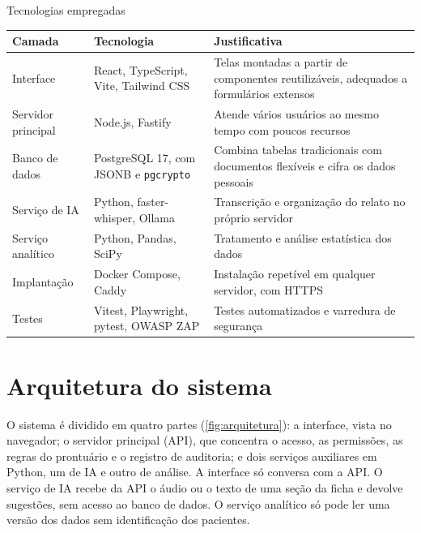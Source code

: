 \begin{quadro}[htbp]
	\caption{Tecnologias empregadas}
	\label{qua:stack}
	\footnotesize
	\begin{tabularx}{\textwidth}{|L{2.8cm}|L{4.8cm}|Y|}
		\hline
		\textbf{Camada} & \textbf{Tecnologia} & \textbf{Justificativa} \\ \hline
		Interface & React, TypeScript, Vite, Tailwind CSS & Telas montadas a partir de componentes reutilizáveis, adequados a formulários extensos \cite{parida2024} \\ \hline
		Servidor principal & Node.js, Fastify & Atende vários usuários ao mesmo tempo com poucos recursos \cite{parida2024} \\ \hline
		Banco de dados & PostgreSQL 17, com JSONB e \texttt{pgcrypto} & Combina tabelas tradicionais com documentos flexíveis \cite{postgres-json} e cifra os dados pessoais \\ \hline
		Serviço de IA & Python, faster-whisper, Ollama & Transcrição e organização do relato no próprio servidor \cite{fasterwhisper,ollama} \\ \hline
		Serviço analítico & Python, Pandas, SciPy & Tratamento e análise estatística dos dados \cite{mckinney2010,virtanen2020} \\ \hline
		Implantação & Docker Compose, Caddy & Instalação repetível em qualquer servidor, com HTTPS \\ \hline
		Testes & Vitest, Playwright, pytest, OWASP ZAP & Testes automatizados e varredura de segurança \cite{zap} \\ \hline
	\end{tabularx}
\end{quadro}

\section{Arquitetura do sistema}
\label{sec:arquitetura}

O sistema é dividido em quatro partes (\autoref{fig:arquitetura}): a interface, vista no navegador; o servidor principal (API), que concentra o acesso, as permissões, as regras do prontuário e o registro de auditoria; e dois serviços auxiliares em Python, um de IA e outro de análise. A interface só conversa com a API. O serviço de IA recebe da API o áudio ou o texto de uma seção da ficha e devolve sugestões, sem acesso ao banco de dados. O serviço analítico só pode ler uma versão dos dados sem identificação dos pacientes.

